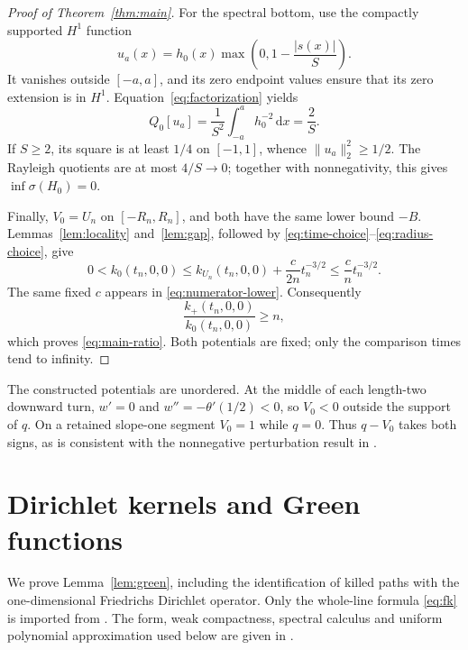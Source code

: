 \documentclass[11pt,a4paper]{article}
\newcommand{\dd}{\,\mathrm d}
\newcommand{\spec}{\sigma}
\begin{document}
\begin{proof}[Proof of Theorem~\ref{thm:main}]
For the spectral bottom, use the compactly supported $H^1$ function
\[
 u_a(x)=h_0(x)\max\left(0,1-\frac{|s(x)|}{S}\right).
\]
It vanishes outside $[-a,a]$, and its zero endpoint values ensure that its
zero extension is in $H^1$. Equation~\eqref{eq:factorization} yields
\[
 Q_0[u_a]=\frac1{S^2}\int_{-a}^a h_0^{-2}\dd x=\frac2S.
\]
If $S\geq2$, its square is at least $1/4$ on $[-1,1]$, whence
$\|u_a\|_2^2\geq1/2$. The Rayleigh quotients are at most $4/S\to0$;
together with nonnegativity, this gives $\inf\spec(H_0)=0$.

Finally, $V_0=U_n$ on $[-R_n,R_n]$, and both have the same lower bound
$-B$. Lemmas~\ref{lem:locality} and~\ref{lem:gap}, followed by
\eqref{eq:time-choice}--\eqref{eq:radius-choice}, give
\[
 0<k_0(t_n,0,0)\leq k_{U_n}(t_n,0,0)+\frac{c}{2n}t_n^{-3/2}
                  \leq\frac cn t_n^{-3/2}.
\]
The same fixed $c$ appears in \eqref{eq:numerator-lower}. Consequently
\[
 \frac{k_+(t_n,0,0)}{k_0(t_n,0,0)}\geq n,
\]
which proves \eqref{eq:main-ratio}. Both potentials are fixed; only the
comparison times tend to infinity.
\end{proof}

The constructed potentials are unordered. At the middle of each length-two
downward turn, $w'=0$ and $w''=-\theta'(1/2)<0$, so $V_0<0$ outside the
support of $q$. On a retained slope-one segment $V_0=1$ while $q=0$.
Thus $q-V_0$ takes both signs, as is consistent with the nonnegative
perturbation result in \cite[Corollary 1]{FKP}.

\appendix
\section{Dirichlet kernels and Green functions}\label{sec:dirichlet}

We prove Lemma~\ref{lem:green}, including the identification of killed paths
with the one-dimensional Friedrichs Dirichlet operator. Only the whole-line
formula \eqref{eq:fk} is imported from \cite{Simon}. The form, weak compactness,
spectral calculus and uniform polynomial approximation used below are given
in \cite[Theorems 2.12--2.13, Lemma 1.13, Theorems 3.1, 3.7 and 1.15]{Teschl}.
\end{document}
